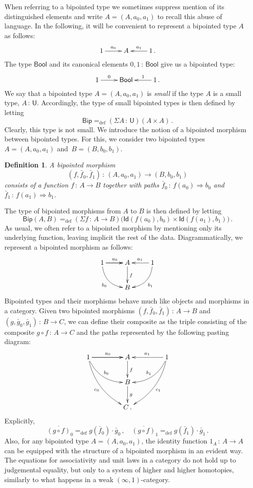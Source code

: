 \documentclass[10pt,a4paper,oneside,reqno]{amsart}
\theoremstyle{mythm}
\theoremstyle{mydef}
\newtheorem{definition}[theorem]{Definition}
\theoremstyle{myrmk}
\newcommand{\ie}{\text{i.e.\ }}
\newcommand{\defeq}{=_{\mathrm{def}}}
\newcommand{\co}{\,{:}\,}
\newcommand{\Bool}{\mathsf{Bool}}
\newcommand{\Id}{\mathsf{Id}}
\newcommand{\U}{\mathsf{U}}
\newcommand{\Bip}{\mathsf{Bip}}
\newcommand{\BipHom}{\mathsf{Bip}}
\begin{document}
When referring to a bipointed type we sometimes suppress mention of its distinguished elements and write $A = (A, a_0, a_1)$ to recall this abuse of language.  In the following, it will be convenient to represent a bipointed type $A$  as follows:
\[
\xymatrix{
 1 \ar[r]^-{a_0}&  A & 1 \ar[l]_-{a_1} \, .}
 \]
The type $\Bool$ and its canonical elements $0, 1 \co \Bool$ give us a bipointed type:
\[
\xymatrix{
 1 \ar[r]^-{0}&  \Bool  & 1 \ar[l]_-{1} \, . }
 \]
We say that a bipointed type $A = (A, a_0, a_1)$ is \emph{small} if the type $A$ is a small type, \ie $A \co \U$. 
Accordingly, the type of small bipointed types is then defined by letting 
\[
\Bip \defeq (\Sigma A \co \U)( A \times A ) \, .
\]
Clearly,  this type is not small.  We introduce the notion of a bipointed morphism between bipointed types. 
For this, we consider two bipointed types $A = (A, a_0, a_1)$ and~$B = (B, b_0, b_1)$. 


\begin{definition} A \emph{bipointed morphism} 
\[
(f, \bar{f}_0, \bar{f}_1)  \co (A, a_0, a_1)  \to (B, b_0, b_1)
\] 
consists of a function $f \co A \to B$ together with paths $\bar{f}_0 \co  f(a_0) \Rightarrow b_0$ 
and~$\bar{f}_1 \co f(a_1) \Rightarrow b_1$.  \end{definition}


The type of bipointed morphisms from $A$ to $B$ is then defined by letting
\[
\BipHom(A,B) \defeq (\Sigma f \co A \to B) \big( \Id(  f(a_0), b_0 )  \times \Id(  f(a_1), b_1 )  \big) \, .
\]
As usual, we often refer to a bipointed morphism by mentioning only its underlying function, leaving implicit
the rest of the data. Diagrammatically, we represent a bipointed morphism as follows:
\[
\xymatrix{
1 \ar[r]   \ar[r]^{a_0} \ar@/_1pc/[dr]_{b_0}  & A  \ar[d]^{f} & 1  \ar[l]_{a_1} \ar@/^1pc/[dl]^{b_1} \\
  & B  &  }
 \]
Bipointed types and their morphisms behave much like objects and morphisms in a category.
Given two bipointed morphisms  $(f, \bar{f}_0, \bar{f}_1) \co A \to B$ and $(g, \bar{g}_0, \bar{g}_1) \co B \to C$, we can define their composite 
 as the triple consisting of the composite $g \circ f \co A \to C$ and the paths represented
by the following pasting diagram:
\[
\xymatrix@C=1.5cm{
1 \ar[r]   \ar[r]^{a_0}   \ar@/_1pc/[dr]^{b_0} \ar@/_1pc/[ddr]_{c_0}  & A  \ar[d]^{f} & 1 \ar[l]_{a_1}  \ar@/^1pc/[dl]_{b_1}  \ar@/^1pc/[ddl]^{c_1} \\
  & B \ar[d]^g &   \\
  & C \, . &   }
  \]
Explicitly,
\[
\overline{(g \circ f)}_0 \defeq g(\bar{f}_0) \cdot  \bar{g}_0 \, ,   \quad 
\overline{(g \circ f) }_1 \defeq  g(\bar{f}_1) \cdot   \bar{g}_1 \, .
\]
Also, for any bipointed type $A = (A, a_0, a_1)$, the identity function $1_A \co A \to A$ can be equipped with the structure of a bipointed morphism in an evident way. 
The equations for associativity and unit laws in a category do not hold up to judgemental equality, but only 
to a system of higher and higher homotopies, similarly to what happens in a weak $(\infty,1)$-category.  
\end{document}
